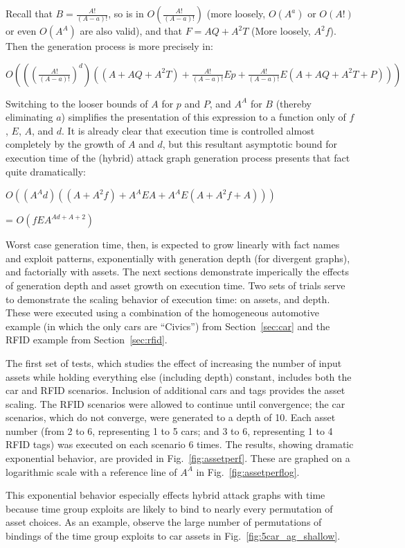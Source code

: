 Recall that $B = \frac{A!}{(A-a)!}$, so is in $O(\frac{A!}{(A-a)!})$ 
(more loosely, $O(A^a)$ or $O(A!)$ or
even $O(A^A)$ are also valid), and that $F = AQ + A^2T$ (More loosely, $A^2f$). 
Then the generation process is more precisely in:

$O(((\frac{A!}{(A-a)!})^d)((A+AQ + A^2T) + \frac{A!}{(A-a)!}Ep + \frac{A!}{(A-a)!}E(A+AQ + A^2T+P)))$

Switching to the looser bounds of $A$ for $p$ and $P$, and $A^A$ for $B$ 
(thereby eliminating $a$) 
simplifies the presentation of this expression to a function only of $f$,
$E$, $A$, and $d$. It is already clear that execution time is controlled almost
completely by the growth of $A$ and $d$, but this resultant asymptotic bound for
execution time of the (hybrid) attack graph generation process presents that 
fact quite dramatically:

$O((A^Ad)((A+A^2f) + A^AEA + A^AE(A+A^2f+A)))$

= $O(fEA^{Ad+A+2})$

Worst case generation time, then, is expected to grow linearly with fact names 
and exploit patterns, exponentially with generation depth (for divergent 
graphs), and factorially with assets. The next sections demonstrate imperically
the effects of generation depth and asset growth on execution time.
Two sets of trials serve to demonstrate the scaling behavior of execution time:
on assets, and depth. These were executed using a combination of the 
homogeneous automotive example (in which the only cars are ``Civics'') from
Section~\ref{sec:car} and the RFID example from Section~\ref{sec:rfid}.

The first set of tests, which studies the effect of increasing the number of 
input assets while holding everything else (including depth) constant,
includes both the car and RFID scenarios. Inclusion of additional cars and
tags provides the asset scaling. The RFID scenarios were allowed to continue
until convergence; the car scenarios, which do not converge, were generated
to a depth of 10. Each asset number (from 2 to 6, representing 1 to 5 cars; and
3 to 6, representing 1 to 4 RFID tags) was executed on each scenario 6 times.
The results, showing dramatic exponential behavior, are provided in 
Fig.~\ref{fig:assetperf}. These are graphed on a logarithmic scale with a
reference line of $A^A$ in Fig.~\ref{fig:assetperflog}.

This exponential behavior especially effects hybrid attack graphs with time 
because time group exploits are likely to bind to nearly every permutation of 
asset choices. As an example, observe the large number of permutations of 
bindings of the time group exploits to car assets in 
Fig.~\ref{fig:5car_ag_shallow}.

